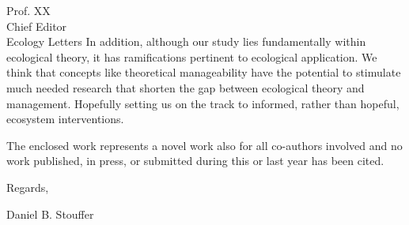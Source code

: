 \documentclass[10pt, a4paper]{letter}
\begin{document}
\begin{letter}{
       Prof. XX\\
       Chief Editor\\
       Ecology Letters}
In addition, although our study lies fundamentally within ecological theory, it has ramifications pertinent to ecological application. 
We think that concepts like theoretical manageability have the potential to stimulate much needed research that shorten the gap between ecological theory and management.
Hopefully setting us on the track to informed, rather than hopeful, ecosystem interventions. 

The enclosed work represents a novel work also for all co-authors involved and no work published, in press, or submitted during this or last year has been cited. 

\closing{Regards,}

Daniel B. Stouffer

\end{letter}
\end{document}
